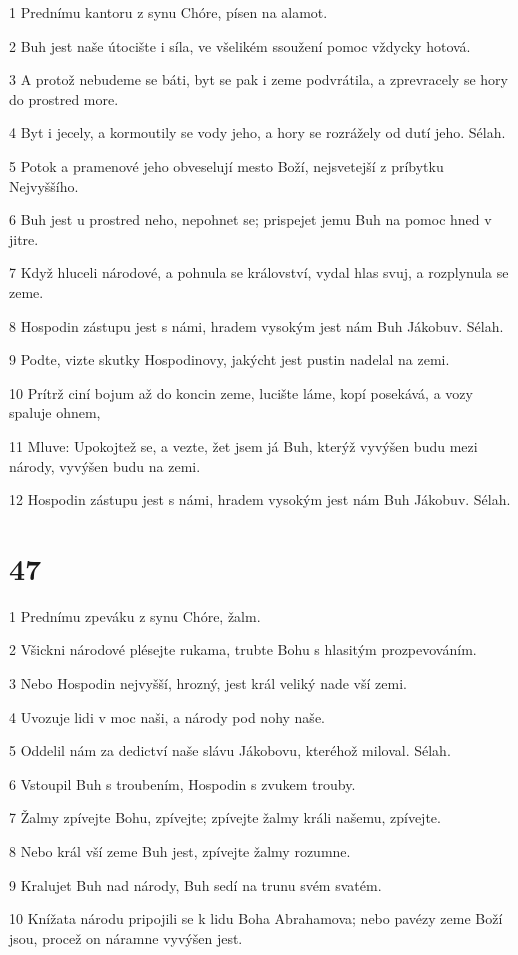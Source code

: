 \par 1 Prednímu kantoru z synu Chóre, písen na alamot.
\par 2 Buh jest naše útocište i síla, ve všelikém ssoužení pomoc vždycky hotová.
\par 3 A protož nebudeme se báti, byt se pak i zeme podvrátila, a zprevracely se hory do prostred more.
\par 4 Byt i jecely, a kormoutily se vody jeho, a hory se rozrážely od dutí jeho. Sélah.
\par 5 Potok a pramenové jeho obveselují mesto Boží, nejsvetejší z príbytku Nejvyššího.
\par 6 Buh jest u prostred neho, nepohnet se; prispejet jemu Buh na pomoc hned v jitre.
\par 7 Když hluceli národové, a pohnula se království, vydal hlas svuj, a rozplynula se zeme.
\par 8 Hospodin zástupu jest s námi, hradem vysokým jest nám Buh Jákobuv. Sélah.
\par 9 Podte, vizte skutky Hospodinovy, jakýcht jest pustin nadelal na zemi.
\par 10 Prítrž ciní bojum až do koncin zeme, lucište láme, kopí posekává, a vozy spaluje ohnem,
\par 11 Mluve: Upokojtež se, a vezte, žet jsem já Buh, kterýž vyvýšen budu mezi národy, vyvýšen budu na zemi.
\par 12 Hospodin zástupu jest s námi, hradem vysokým jest nám Buh Jákobuv. Sélah.

\chapter{47}

\par 1 Prednímu zpeváku z synu Chóre, žalm.
\par 2 Všickni národové plésejte rukama, trubte Bohu s hlasitým prozpevováním.
\par 3 Nebo Hospodin nejvyšší, hrozný, jest král veliký nade vší zemi.
\par 4 Uvozuje lidi v moc naši, a národy pod nohy naše.
\par 5 Oddelil nám za dedictví naše slávu Jákobovu, kteréhož miloval. Sélah.
\par 6 Vstoupil Buh s troubením, Hospodin s zvukem trouby.
\par 7 Žalmy zpívejte Bohu, zpívejte; zpívejte žalmy králi našemu, zpívejte.
\par 8 Nebo král vší zeme Buh jest, zpívejte žalmy rozumne.
\par 9 Kralujet Buh nad národy, Buh sedí na trunu svém svatém.
\par 10 Knížata národu pripojili se k lidu Boha Abrahamova; nebo pavézy zeme Boží jsou, procež on náramne vyvýšen jest.


